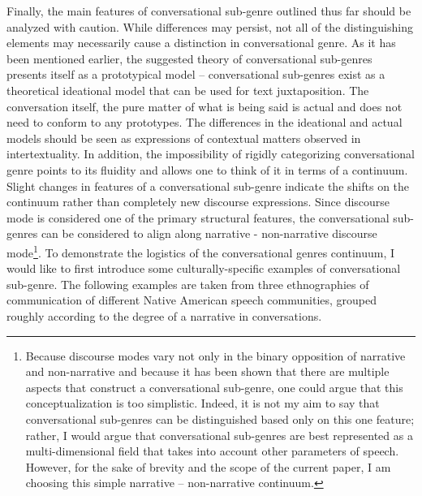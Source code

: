 \documentclass[12pt]{article}
\begin{document}
Finally, the main features of conversational sub-genre outlined thus far should be analyzed with caution. While differences may persist, not all of the distinguishing elements may necessarily cause a distinction in conversational genre. As it has been mentioned earlier, the suggested theory of conversational sub-genres presents itself as a prototypical model -- conversational sub-genres exist as a theoretical ideational model that can be used for text juxtaposition. The conversation itself, the pure matter of what is being said is actual and does not need to conform to any prototypes. The differences in the ideational and actual models should be seen as expressions of contextual matters observed in intertextuality. In addition, the impossibility of rigidly categorizing conversational genre points to its fluidity and allows one to think of it in terms of a continuum. Slight changes in features of a conversational sub-genre indicate the shifts on the continuum rather than completely new discourse expressions. Since discourse mode is considered one of the primary structural features, the conversational sub-genres can be considered to align along narrative - non-narrative discourse mode\footnote{Because discourse modes vary not only in the binary opposition of narrative and non-narrative and because it has been shown that there are multiple aspects that construct a conversational sub-genre, one could argue that this conceptualization is too simplistic. Indeed, it is not my aim to say that conversational sub-genres can be distinguished based only on this one feature; rather, I would argue that conversational sub-genres are best represented as a multi-dimensional field that takes into account other parameters of speech. However, for the sake of brevity and the scope of the current paper, I am choosing this simple narrative -- non-narrative continuum.}. To demonstrate the logistics of the conversational genres continuum, I would like to first introduce some culturally-specific examples of conversational sub-genre. The following examples are taken from three ethnographies of communication of different Native American speech communities, grouped roughly according to the degree of a narrative in conversations. 
\end{document}
